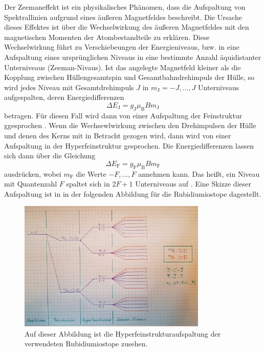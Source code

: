 Der Zeemaneffekt ist ein physikalisches Phänomen, dass die Aufspaltung von
Spektrallinien aufgrund eines äußeren Magnetfeldes beschreibt. Die Ursache dieses 
Effektes ist über die Wechselwirkung des äußeren Magnetfeldes mit den magnetischen 
Momenten der Atombestandteile zu erklären. Diese Wechselwirkung führt zu 
Verschiebeungen der Energieniveaus, bzw. in eine Aufspaltung eines ursprünglichen 
Niveaus in eine bestimmte Anzahl äquidistanter Unterniveaus (Zeeman-Nivaus). 
Ist das angelegte Magnetfeld kleiner als die Kopplung zwischen Hüllengesamtspin 
und Gesamtbahndrehimpuls der Hülle, so wird jedes Niveau mit 
Gesamtdrehimpuls $J$ in $m_{\text{J}}= -J,...,J$ Unterniveaus aufgespalten, deren 
Energiedifferenzen
\begin{equation}
    \Delta E_{\text{J}} = g_{\text{J}} \mu_{\text{B}} B m_{\text{J}}
\end{equation}
betragen. Für diesen Fall wird dann von einer Aufspaltung der Feinstruktur ggesprochen \cite{1}.
Wenn die Wechsewlwirkung zwischen den Drehimpulsen der Hülle und denen des Kerns 
mit in Betracht gezogen wird, dann wird von einer Aufspaltung in der Hyperfeinstruktur
gesprochen. Die Energiedifferenzen lassen sich dann über die Gleichung 
\begin{equation}
    \Delta E_{\text{F}} = g_{\text{F}} \mu_{\text{B}} B m_{\text{F}}
\end{equation}
ausdrücken, wobei $m_{\text{F}}$ die Werte $-F,...,F$ annehmen kann.
Das heißt, ein Niveau mit Quantenzahl $F$ spaltet sich in $2F+1$ Unterniveaus auf \cite{2}.
Eine Skizze dieser Aufspaltung ist in in der folgenden Abbildung für 
die Rubidiumiostope dagestellt.
\begin{figure}
    \centering
    \includegraphics[width=0.8\textwidth]{figure/Zeemanniveaus.pdf}
    \caption{Auf dieser Abbildung ist die Hyperfeinstrukturaufspaltung der 
    verwendeten Rubidiumiostope zusehen.}
    \label{abb1}
\end{figure}

